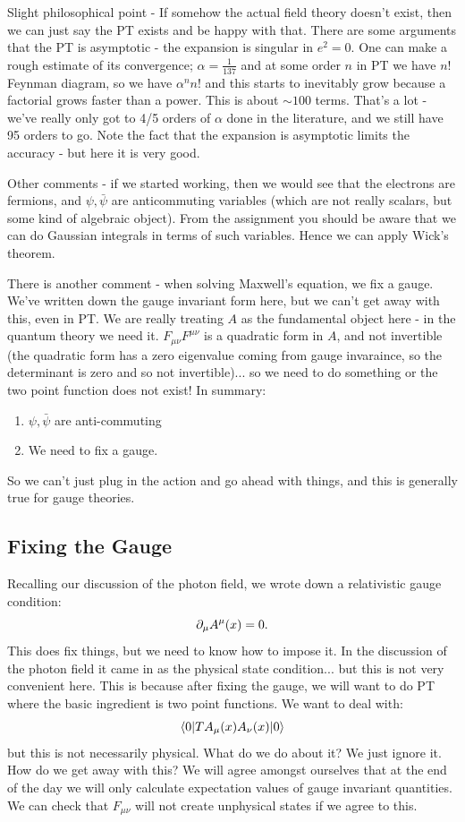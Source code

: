Slight philosophical point - If somehow the actual field theory doesn't exist, then we can just say the PT exists and be happy with that. There are some arguments that the PT is asymptotic - the expansion is singular in $e^2 = 0$. One can make a rough estimate of its convergence; $\alpha = \frac{1}{137}$ and at some order $n$ in PT we have $n!$ Feynman diagram, so we have $\alpha^n n!$ and this starts to inevitably grow because a factorial grows faster than a power. This is about $\sim 100$ terms. That's a lot - we've really only got to 4/5 orders of $\alpha$ done in the literature, and we still have 95 orders to go. Note the fact that the expansion is asymptotic limits the accuracy - but here it is very good.

Other comments - if we started working, then we would see that the electrons are fermions, and $\psi, \bar{\psi}$ are anticommuting variables (which are not really scalars, but some kind of algebraic object). From the assignment you should be aware that we can do Gaussian integrals in terms of such variables. Hence we can apply Wick's theorem.

There is another comment - when solving Maxwell's equation, we fix a gauge. We've written down the gauge invariant form here, but we can't get away with this, even in PT. We are really treating $A$ as the fundamental object here - in the quantum theory we need it. $F_{\mu\nu}F^{\mu\nu}$ is a quadratic form in $A$, and not invertible (the quadratic form has a zero eigenvalue coming from gauge invaraince, so the determinant is zero and so not invertible)... so we need to do something or the two point function does not exist! In summary:
\begin{enumerate}
    \item $\psi, \bar{\psi}$ are anti-commuting
    \item We need to fix a gauge.
\end{enumerate}
So we can't just plug in the action and go ahead with things, and this is generally true for gauge theories. 

\subsection{Fixing the Gauge}
Recalling our discussion of the photon field, we wrote down a relativistic gauge condition:
\begin{equation}
    \partial_\mu A^\mu(x) = 0.
\end{equation}
This does fix things, but we need to know how to impose it. In the discussion of the photon field it came in as the physical state condition... but this is not very convenient here. This is because after fixing the gauge, we will want to do PT where the basic ingredient is two point functions. We want to deal with:
\begin{equation}
    \langle 0 \rvert TA_\mu(x)A_\nu(x)\lvert 0 \rangle
\end{equation}
but this is not necessarily physical. What do we do about it? We just ignore it. How do we get away with this? We will agree amongst ourselves that at the end of the day we will only calculate expectation values of gauge invariant quantities. We can check that $F_{\mu\nu}$ will not create unphysical states if we agree to this.

